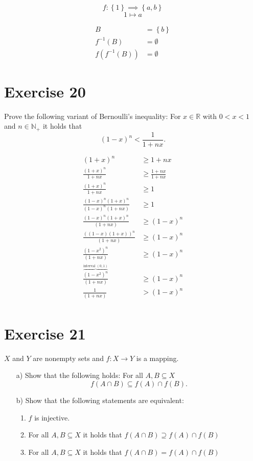 \documentclass[a4paper]{article}
\theoremstyle{definition}
\newcommand\set[1]{\left\{#1\right\}}
\begin{document}
\[ f: \set{1} \implies \set{a, b} \]
\[ 1 \mapsto a \]

\begin{align*}
  B &= \set{b} \\
  f^{-1}(B) &= \emptyset \\
  f(f^{-1}(B)) &= \emptyset
\end{align*}

\section{Exercise 20}

\begin{ex}
  Prove the following variant of Bernoulli's inequality: For $x \in \mathbb{R}$
  with $0 < x < 1$ and $n \in \mathbb{N}_+$ it holds that
  \[ (1 - x)^n < \frac{1}{1 + nx}. \]
\end{ex}
\begin{align*}
  (1 + x)^n &\geq 1 + nx \\
  \frac{(1 + x)^n}{1 + nx} &\geq \frac{1 + nx}{1 + nx} \\
  \frac{(1 + x)^n}{1 + nx} &\geq 1 \\
  \frac{(1 - x)^n (1 + x)^n}{(1 - x)^n (1 + nx)} &\geq 1 \\
  \frac{(1 - x)^n (1 + x)^n}{(1 + nx)} &\geq (1 - x)^n \\
  \frac{\left((1 - x)(1 + x)\right)^n}{(1 + nx)} &\geq (1 - x)^n \\
  \frac{\left(1 - x^2\right)^n}{(1 + nx)} &\geq (1 - x)^n \\
  \frac{\overbrace{\left(1 - x^2\right)^n}^{\text{interval }(0,1)}}{(1 + nx)} &\geq (1 - x)^n \\
  \frac{1}{(1 + nx)} &> (1 - x)^n \\
\end{align*}


\section{Exercise 21}

\begin{ex}
  $X$ and $Y$ are nonempty sets and $f: X \to Y$ is a mapping.
  \begin{itemize}
    \item[a)]
      Show that the following holds: For all $A, B \subseteq X$
      \[ f(A \cap B) \subseteq f(A) \cap f(B). \]
    \item[b)]
      Show that the following statements are equivalent:
      \begin{enumerate}
        \item $f$ is injective.
        \item For all $A, B \subseteq X$ it holds that $f(A \cap B) \supseteq f(A) \cap f(B)$
        \item For all $A, B \subseteq X$ it holds that $f(A \cap B) = f(A) \cap f(B)$
      \end{enumerate}
  \end{itemize}
\end{ex}
\end{document}
